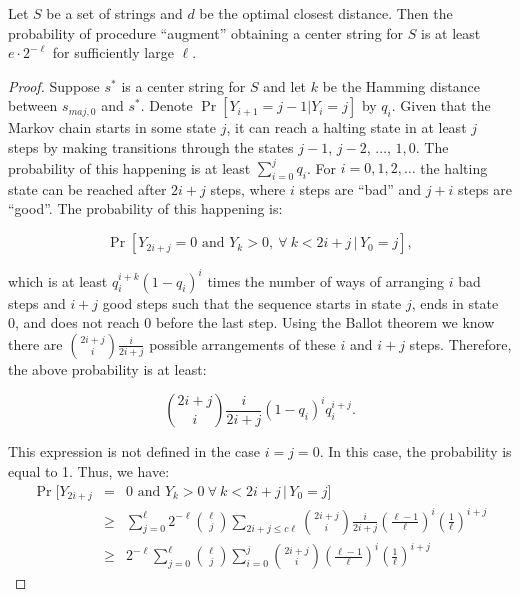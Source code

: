 \begin{theorem} \label{runtime_theorem} Let $S$ be a set of strings and $d$ be the optimal closest distance.  Then the probability of procedure ``augment'' obtaining a center string for $S$ is at least $e\cdot 2^{-\ell}$ for sufficiently large $\ell$. \end{theorem}

\begin{proof} Suppose $s^*$ is a center string for $S$ and let $k$ be the Hamming distance between $s_{maj, 0}$ and $s^*$. Denote $\Pr[Y_{i + 1} = j - 1 | Y_i = j]$ by $q_i$.  Given that the Markov chain starts in some state $j$, it can reach a halting state in at least $j$ steps by making transitions through the states $j - 1$, $j - 2$, $\ldots$, $1, 0$.  The probability of this happening is at least $\sum_{i = 0}^j q_i$.  For $i = 0, 1, 2, \ldots$ the halting state can be reached after $2i + j$ steps, where $i$ steps are ``bad'' and $j + i$ steps are ``good''.   The probability of this happening is: 

\[\Pr[Y_{2i+j} = 0 \mbox{ and } Y_k > 0, \: \forall \: k < 2i +j \, | \, Y_0 = j ],\]

\noindent which is at least $q_i^{i + k} (1 - q_i)^{i}$ times the number of ways of arranging $i$ bad steps and $i + j$ good steps such that the sequence starts in state $j$, ends in state 0, and does not reach 0 before the last step. Using the Ballot theorem we know there are ${{2i + j}\choose{i}}\frac{i}{2i +j}$ possible arrangements of these $i$ and $i + j$ steps. Therefore, the above probability is at least:

\[{{2i + j}\choose{i}}\frac{i}{2i +j} (1 - q_i)^{i} q_i^{i + j}.\]

This expression is not defined in the case $i = j = 0$.  In this case, the probability is equal to 1.  Thus, we have: 
\begin{eqnarray*}
\Pr[Y_{2i+j} \!\!&=&  \! 0 \mbox{ and } Y_k > 0 \: \forall \: k < 2i +j \, | \, Y_0 = j ]  \\
&\geq& \sum_{j = 0}^{\ell} 2^{-\ell} {\ell \choose j} \sum_{2i + j \leq c\ell} {{2i + j}\choose{i}}\frac{i}{2i +j} \left( \frac{\ell - 1}{\ell}\right)^{i} \left( \frac{1}{\ell}\right)^{i + j} \\
&\geq& 2^{-\ell} \sum_{j = 0}^{\ell}  {\ell \choose j} \sum_{i = 0}^{j} {{2i + j}\choose{i}} \left( \frac{\ell - 1}{\ell}\right)^{i} \left( \frac{1}{\ell}\right)^{i + j} 
\end{eqnarray*}


\end{proof}
